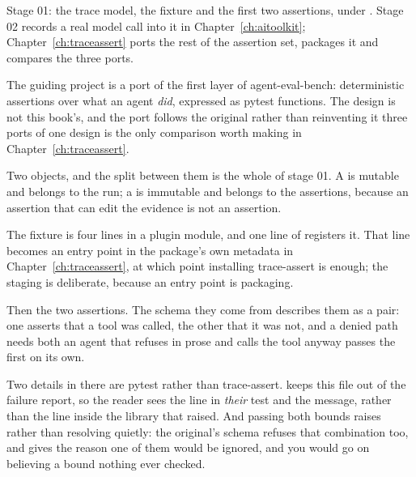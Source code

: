 \begin{projectbox}
Stage 01: the trace model, the  fixture and the first two
assertions, under . Stage 02 records a real
model call into it in Chapter~\ref{ch:aitoolkit};
Chapter~\ref{ch:traceassert} ports the rest of the assertion set, packages
it and compares the three ports.
\end{projectbox}

\noindent
The guiding project is a port of the first layer of agent-eval-bench:
deterministic assertions over what an agent \emph{did}, expressed as pytest
functions. The design is not this book's, and the port follows the original
rather than reinventing it \dash{} three ports of one design is the only
comparison worth making in Chapter~\ref{ch:traceassert}.

Two objects, and the split between them is the whole of stage 01. A
 is mutable and belongs to the run; a  is immutable
and belongs to the assertions, because an assertion that can edit the
evidence is not an assertion.


\noindent
The fixture is four lines in a plugin module, and one line of
 registers it. That line becomes an entry point in the
package's own metadata in Chapter~\ref{ch:traceassert}, at which point
installing trace-assert is enough; the staging is deliberate, because an
entry point is packaging.


\noindent
Then the two assertions. The schema they come from describes them as a pair:
one asserts that a tool was called, the other that it was not, and a denied
path needs both \dash{} an agent that refuses in prose and calls the tool
anyway passes the first on its own.


\noindent
Two details in there are pytest rather than trace-assert.  keeps this file out of the failure report, so the reader
sees the line in \emph{their} test and the message, rather than the line
inside the library that raised. And passing both bounds raises
 rather than resolving quietly: the original's schema
refuses that combination too, and gives the reason \dash{} one of them would
be ignored, and you would go on believing a bound nothing ever checked.


